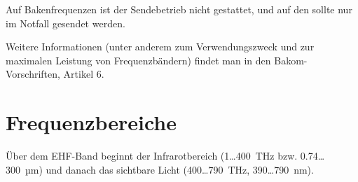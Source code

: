 Auf Bakenfrequenzen ist der Sendebetrieb nicht gestattet, und auf den  sollte nur im Notfall gesendet werden. 

Weitere Informationen (unter anderem zum Verwendungszweck und zur maximalen Leistung von Frequenzbändern) findet man in den Bakom-Vorschriften, Artikel 6. 

\section{Frequenzbereiche}

Über dem EHF-Band beginnt der Infrarotbereich (1…400 THz bzw. 0.74…300 µm) und danach das sichtbare Licht (400…790 THz, 390…790 nm).

{
\newcommand{\freq}[2]{\parbox[t]{6em}{#1\\ \footnotesize #2}}

}
